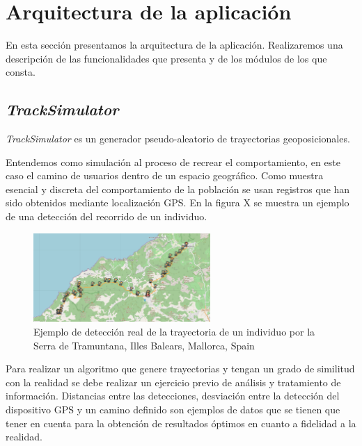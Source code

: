 
\chapter{Arquitectura de la aplicación}

En esta sección presentamos la arquitectura de la aplicación. Realizaremos una 
descripción de las funcionalidades que presenta y de los módulos de los que consta.

\section{\textit{TrackSimulator}}
\textit{TrackSimulator} es un generador pseudo-aleatorio de trayectorias geoposicionales.

Entendemos como simulación al proceso de recrear el comportamiento, en este caso el camino 
de usuarios dentro de un espacio geográfico. Como muestra esencial y discreta del comportamiento de la 
población se usan registros que han sido obtenidos mediante localización \ac{GPS}. En la figura X
se muestra un ejemplo de una detección del recorrido de un individuo.

\begin{figure}[htb]
\begin{center}
\includegraphics[width=0.6\textwidth]{./Imagenes/RealTrackDetection.png}
\caption{Ejemplo de detección real de la trayectoria de un individuo por la Serra de Tramuntana, Illes 
Balears, Mallorca, Spain}
\label{TrackExample1}
\end{center}
\end{figure}
Para realizar un algoritmo que genere trayectorias y tengan un grado de similitud con la realidad se debe 
realizar un ejercicio previo de análisis y tratamiento de información. Distancias entre las detecciones, 
desviación entre la detección del dispositivo \ac{GPS} y un camino definido son ejemplos de datos que se 
tienen que tener en cuenta para la obtención de resultados óptimos en cuanto a fidelidad a la realidad.

